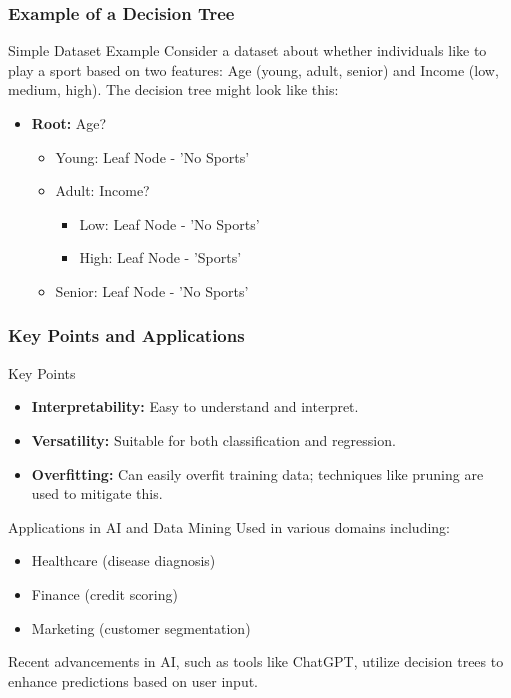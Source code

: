 \documentclass[aspectratio=169]{beamer}
\begin{document}
\begin{frame}[fragile]
    \frametitle{Example of a Decision Tree}
    \begin{block}{Simple Dataset Example}
        Consider a dataset about whether individuals like to play a sport based on two features: Age (young, adult, senior) and Income (low, medium, high). The decision tree might look like this:
        \begin{itemize}
            \item \textbf{Root:} Age?
            \begin{itemize}
                \item Young: Leaf Node - 'No Sports'
                \item Adult: Income?
                \begin{itemize}
                    \item Low: Leaf Node - 'No Sports'
                    \item High: Leaf Node - 'Sports'
                \end{itemize}
                \item Senior: Leaf Node - 'No Sports'
            \end{itemize}
        \end{itemize}
    \end{block}
\end{frame}

\begin{frame}[fragile]
    \frametitle{Key Points and Applications}
    \begin{block}{Key Points}
        \begin{itemize}
            \item \textbf{Interpretability:} Easy to understand and interpret.
            \item \textbf{Versatility:} Suitable for both classification and regression.
            \item \textbf{Overfitting:} Can easily overfit training data; techniques like pruning are used to mitigate this.
        \end{itemize}
    \end{block}
    \begin{block}{Applications in AI and Data Mining}
        Used in various domains including:
        \begin{itemize}
            \item Healthcare (disease diagnosis)
            \item Finance (credit scoring)
            \item Marketing (customer segmentation)
        \end{itemize}
        Recent advancements in AI, such as tools like ChatGPT, utilize decision trees to enhance predictions based on user input.
    \end{block}
\end{frame}
\end{document}
